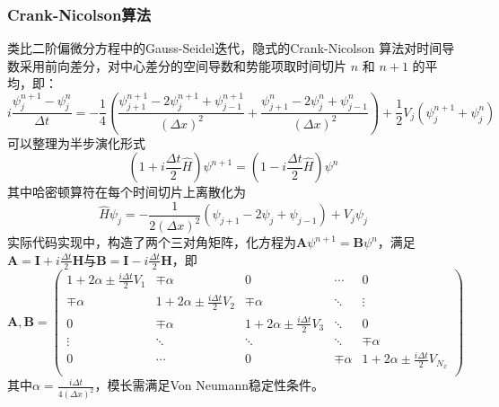 \subsubsection{Crank-Nicolson算法}
类比二阶偏微分方程中的Gauss-Seidel迭代，隐式的Crank-Nicolson 算法对时间导数采用前向差分，对中心差分的空间导数和势能项取时间切片 \(n\) 和 \(n+1\) 的平均，即：
\[
    i \frac{\psi_j^{n+1} - \psi_j^n}{\Delta t} = -\frac{1}{4} \left( \frac{\psi_{j+1}^{n+1} - 2\psi_j^{n+1} + \psi_{j-1}^{n+1}}{(\Delta x)^2} + \frac{\psi_{j+1}^n - 2\psi_j^n + \psi_{j-1}^n}{(\Delta x)^2} \right) + \frac{1}{2} V_j \left( \psi_j^{n+1} + \psi_j^n \right)
\]
可以整理为半步演化形式
\[
    \left( 1 + i \frac{\Delta t}{2} \hat{H} \right) \psi^{n+1} = \left( 1 - i \frac{\Delta t}{2} \hat{H} \right) \psi^n
\]
其中哈密顿算符在每个时间切片上离散化为
\[
    \hat{H} \psi_j = -\frac{1}{2 (\Delta x)^2} \left( \psi_{j+1} - 2\psi_j + \psi_{j-1} \right) + V_j \psi_j
\]
实际代码实现中，构造了两个三对角矩阵，化方程为$\mathbf{A} \psi^{n+1} = \mathbf{B} \psi^n$，满足$\mathbf{A} = \mathbf{I} + i \frac{\Delta t}{2} \mathbf{H}\text{与}\mathbf{B} = \mathbf{I} - i \frac{\Delta t}{2} \mathbf{H}$，即
\[
    \mathbf{A}, \mathbf{B} =
    \begin{pmatrix}
        1 + 2\alpha \pm \frac{i \Delta t}{2} V_1 & \mp \alpha                               & 0                                        & \cdots     & 0                                            \\
        \mp \alpha                               & 1 + 2\alpha \pm \frac{i \Delta t}{2} V_2 & \mp \alpha                               & \ddots     & \vdots                                       \\
        0                                        & \mp \alpha                               & 1 + 2\alpha \pm \frac{i \Delta t}{2} V_3 & \ddots     & 0                                            \\
        \vdots                                   & \ddots                                   & \ddots                                   & \ddots     & \mp \alpha                                   \\
        0                                        & \cdots                                   & 0                                        & \mp \alpha & 1 + 2\alpha \pm \frac{i \Delta t}{2} V_{N_x} \\
    \end{pmatrix}
\]
其中$
    \alpha = \frac{i \Delta t}{4 (\Delta x)^2}
$，模长需满足Von Neumann稳定性条件。

